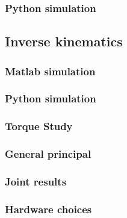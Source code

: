 \subsubsection{Python simulation}

\subsection{Inverse kinematics}
\subsubsection{Matlab simulation}

\subsubsection{Python simulation}

\subsubsection{Torque Study}
\subsubsection{General principal}

\subsubsection{Joint results}

\subsubsection{Hardware choices}
